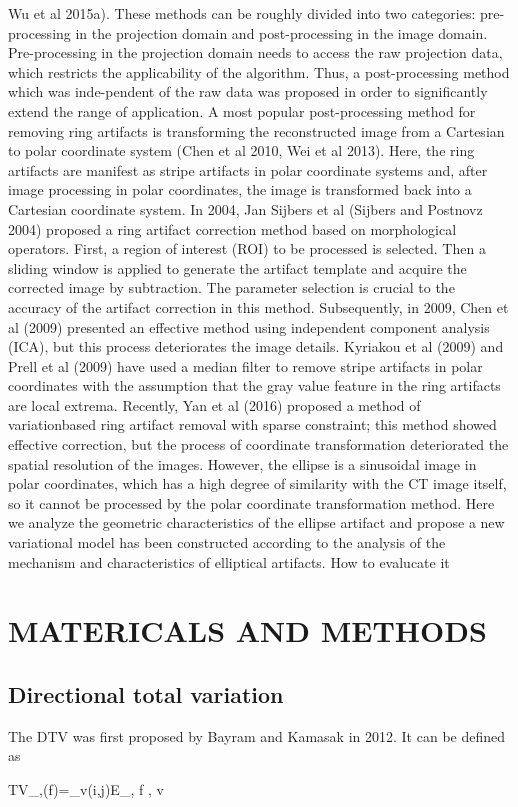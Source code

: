\documentclass[hyperref]{ctexart}
\begin{document}
{\begin{multicols}{2}
		Wu et al 2015a). These methods can be roughly divided into two categories: pre-processing in the projection domain and post-processing in the image domain. Pre-processing in the projection domain needs to access the raw projection data, which restricts the applicability of the algorithm. Thus, a post-processing method which was inde-pendent of the raw data was proposed in order to significantly extend the range of application. A most popular post-processing method for removing ring artifacts is transforming the reconstructed image from a Cartesian to polar coordinate system (Chen et al 2010, Wei et al 2013). Here, the ring artifacts are manifest as stripe artifacts in polar coordinate systems and, after image processing in polar coordinates, the image is transformed back into a Cartesian coordinate system. In 2004, Jan Sijbers et al (Sijbers and Postnovz 2004) proposed a ring artifact correction method based on morphological operators. First, a region of interest (ROI) to be processed is selected. Then a sliding window is applied to generate the artifact template and acquire the corrected image by subtraction. The parameter selection is crucial to the accuracy of the artifact correction in this method. Subsequently, in 2009, Chen et al (2009) presented an effective method using independent component analysis (ICA), but this process deteriorates the image details. Kyriakou et al (2009) and Prell et al (2009) have used a median filter to remove stripe artifacts in polar coordinates with the assumption that the gray value feature in the ring artifacts are local extrema. Recently, Yan et al (2016) proposed a method of variationbased ring artifact removal with sparse constraint; this method showed effective correction, but the process of coordinate transformation deteriorated the spatial resolution of the images. 
		However, the ellipse is a sinusoidal image in polar coordinates, which has a high degree of similarity with the CT image itself, so it cannot be processed by the polar coordinate transformation method. Here we analyze the geometric characteristics of the ellipse artifact and propose a new variational model has been constructed according to the analysis of the mechanism and characteristics of elliptical artifacts.
		How to evalucate it~~~~~~
		
		\section{MATERICALS AND METHODS}
		\subsection{Directional total variation}
		The DTV was first proposed by Bayram and Kamasak in 2012. It can be defined as
		\begin{flalign}
			\begin{split}
				TV_{\alpha,\theta}(f)=_{v(i,j)\in E_{\alpha,\theta}} \quad \left \langle \nabla f , v\right \rangle
			\end{split}
		\end{flalign}
	

\end{multicols}}
\end{document}
